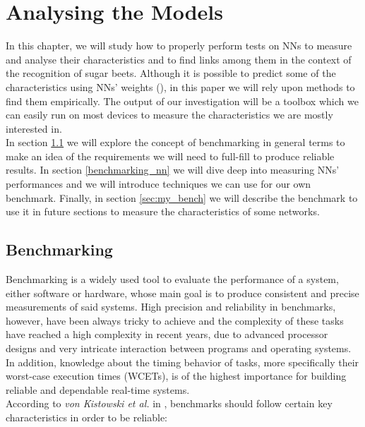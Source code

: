 \chapter{Analysing the Models}\label{ana_models}
In this chapter, we will study how to properly perform tests on NNs to measure and analyse their characteristics and to find links among them in the context of the recognition of sugar beets. Although it is possible to predict some of the characteristics using NNs' weights (\cite{Unterthiner2020PredictingNN}), in this paper we will rely upon methods to find them empirically. The output of our investigation will be a toolbox which we can easily run on most devices to measure the characteristics we are mostly interested in. \\
In section \ref{benchmarking} we will explore the concept of benchmarking in general terms to make an idea of the requirements we will need to full-fill to produce reliable results. In section \ref{benchmarking_nn} we will dive deep into measuring NNs' performances and we will introduce techniques we can use for our own benchmark. Finally, in section \ref{sec:my_bench} we will describe the benchmark to use it in future sections to measure the characteristics of some networks. 

\section{Benchmarking}\label{benchmarking}
Benchmarking is a widely used tool to evaluate the performance of a system, either software or hardware, whose main goal is to produce consistent and precise measurements of said systems. High precision and reliability in benchmarks, however, have been always tricky to achieve and the complexity of these tasks have reached a high complexity in recent years, due to advanced processor designs and very intricate interaction between programs and operating systems. \cite{DBLP:journals/corr/abs-1811-01412}\\
In addition, knowledge about the timing behavior of tasks, more specifically their worst-case execution times (WCETs), is of the highest importance for building reliable and dependable real-time systems. \cite{Real-Time-Systems}\\
According to \textit{von Kistowski et al.} in \cite{how_to_bench}, benchmarks should follow certain key characteristics in order to be reliable:

